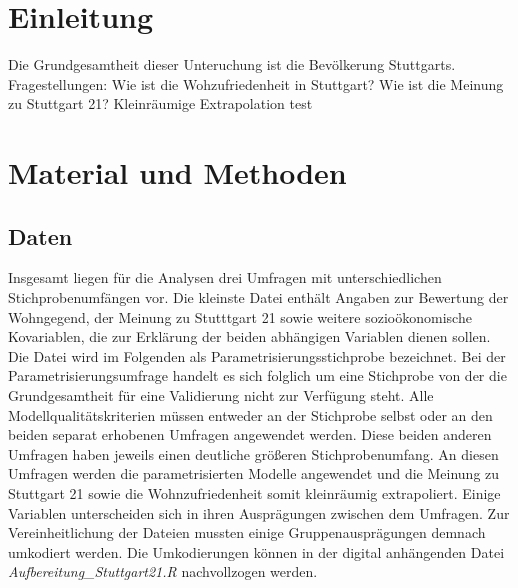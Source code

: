 \documentclass{Vorlage}
\begin{document}
\restoregeometry


\pagestyle{plain}

\tableofcontents %

\newpage %

\listoffigures %

\listoftables %

\newpage



\pagestyle{fancy}

\section{Einleitung}
Die Grundgesamtheit dieser Unteruchung ist die Bevölkerung Stuttgarts.
Fragestellungen: Wie ist die Wohzufriedenheit in Stuttgart? Wie ist die Meinung zu Stuttgart 21? Kleinräumige Extrapolation
test

\newpage

\section{Material und Methoden}
\subsection{Daten}
Insgesamt liegen für die Analysen drei Umfragen mit unterschiedlichen Stichprobenumfängen vor. Die kleinste Datei enthält Angaben zur Bewertung der Wohngegend, der Meinung zu Stutttgart 21 sowie weitere sozioökonomische Kovariablen, die zur Erklärung der beiden abhängigen Variablen dienen sollen. Die Datei wird im Folgenden als Parametrisierungsstichprobe bezeichnet. Bei der Parametrisierungsumfrage handelt es sich folglich um eine Stichprobe von der die Grundgesamtheit für eine Validierung nicht zur Verfügung steht. Alle Modellqualitätskriterien müssen entweder an der Stichprobe selbst oder an den beiden separat erhobenen Umfragen angewendet werden. Diese beiden anderen Umfragen haben jeweils einen deutliche größeren Stichprobenumfang. An diesen Umfragen werden die parametrisierten Modelle angewendet und die Meinung zu Stuttgart 21 sowie die Wohnzufriedenheit somit kleinräumig extrapoliert. Einige Variablen unterscheiden sich in ihren Ausprägungen zwischen dem Umfragen. Zur Vereinheitlichung der Dateien mussten einige Gruppenausprägungen demnach umkodiert werden. Die Umkodierungen können in der digital anhängenden Datei \textit{Aufbereitung\_Stuttgart21.R} nachvollzogen werden.
\end{document}
